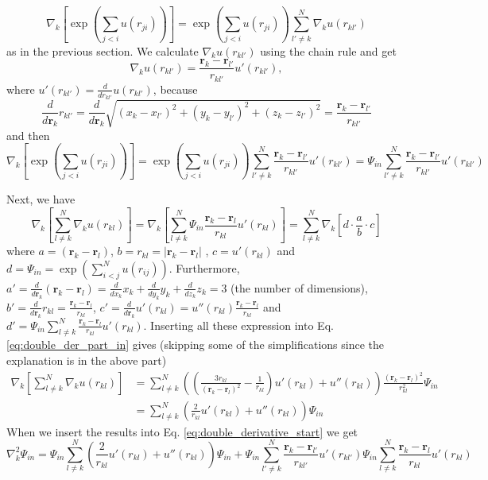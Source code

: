 $$\nabla_k\left[ \exp{\left(\sum_{j<i}u(r_{ji})\right)}\right]=  \exp{\left(\sum_{j<i}u(r_{ji})\right)} \sum^N_{l' \neq k} \nabla_k u (r_{kl'})$$ as in the previous section. We calculate $ \nabla_k u(r_{kl'})$ using the chain rule and get
$$ \nabla_k u(r_{kl'})  = \frac{\mathbf{r}_k - \mathbf{r}_{l'}}{r_{kl'}} u'(r_{kl'}), $$ where $u'(r_{kl'}) = \frac{d}{dr_{kl'}}u(r_{kl'})$, because $$\frac{d}{d\mathbf{r}_{k}}r_{kl'} =\frac{d}{d\mathbf{r}_k}\sqrt{(x_k-x_{l'})^2 + (y_k-y_{l'})^2 + (z_k-z_{l'})^2} = \frac{\mathbf{r}_k - \mathbf{r}_{l'}}{r_{kl'}} $$ and then
$$\nabla_k\left[ \exp{\left(\sum_{j<i}u(r_{ji})\right)}\right]=  \exp{\left(\sum_{j<i}u(r_{ji})\right)} \sum^N_{l' \neq k} \frac{\mathbf{r}_k - \mathbf{r}_{l'}}{r_{kl'}} u'(r_{kl'}) = \Psi_{in} \sum^N_{l' \neq k} \frac{\mathbf{r}_k - \mathbf{r}_{l'}}{r_{kl'}} u'(r_{kl'})  $$

Next, we have
\begin{equation}\label{eq:double_der_part_in}
\nabla_k\left[ \sum^N_{l \neq k} \nabla_k u (r_{kl})\right] = \nabla_k \left[ \sum^N_{l \neq k}  \Psi_{in} \frac{\mathbf{r}_k - \mathbf{r}_{l}}{r_{kl}} u'(r_{kl}) \right] = \sum^N_{l \neq k} \nabla_k \left[ d \cdot \frac{a}{b} \cdot c \right]
\end{equation}
where $a = \left(\mathbf{r}_k-\mathbf{r}_{l}\right)$, $b= r_{kl}=|\mathbf{r}_k-\mathbf{r}_{l}|$ , $c = u'(r_{kl})$ and $d = \Psi_{in}= \exp\left(\sum_{i<j}^N u(r_{ij})\right)$. Furthermore, $a' = \frac{d}{d\mathbf{r}_k} \left(\mathbf{r}_k-\mathbf{r}_{l}\right) = \frac{d}{dx_k} x_k  + \frac{d}{dy_k} y_k  +\frac{d}{dz_k} z_k   = 3$ (the number of dimensions), $b' = \frac{d}{d\mathbf{r}_k} r_{kl} = \frac{\mathbf{r}_k - \mathbf{r}_{l}}{r_{kl}}$, $c' = \frac{d}{d\mathbf{r}_k} u'(r_{kl}) =  u''(r_{kl})\frac{\mathbf{r}_k - \mathbf{r}_{l}}{r_{kl}}$ and $d' = \Psi_{in} \sum^N_{l \neq k} \frac{\mathbf{r}_k - \mathbf{r}_{l}}{r_{kl}} u'(r_{kl})$. Inserting all these expression into Eq. \ref{eq:double_der_part_in} gives (skipping some of the simplifications since the explanation is in the above part)
\begin{align}
\nabla_k\left[ \sum^N_{l \neq k} \nabla_k u (r_{kl})\right] &= \sum^N_{l \neq k} \left( \left(\frac{3r_{kl}}{\left(\mathbf{r}_k-\mathbf{r}_{l}\right)^2}-\frac{1}{r_{kl}}\right)u'(r_{kl}) + u''(r_{kl})\right) \frac{\left(\mathbf{r}_k-\mathbf{r}_{l}\right)^2}{r_{kl}^2} \Psi_{in} \\ \label{eq:doble_der_u}
&= \sum^N_{l \neq k} \left( \frac{2}{r_{kl}}u'(r_{kl}) + u''(r_{kl})\right) \Psi_{in}
\end{align}
When we insert the results into Eq. \ref{eq:double_derivative_start} we get
$$\nabla^2_k\Psi_{in} = \Psi_{in}\sum^N_{l \neq k} \left( \frac{2}{r_{kl}}u'(r_{kl}) + u''(r_{kl})\right) \Psi_{in} +  \Psi_{in} \sum^N_{l' \neq k} \frac{\mathbf{r}_k - \mathbf{r}_{l'}}{r_{kl'}} u'(r_{kl'}) \Psi_{in} \sum^N_{l \neq k} \frac{\mathbf{r}_k - \mathbf{r}_{l}}{r_{kl}} u'(r_{kl})  $$

